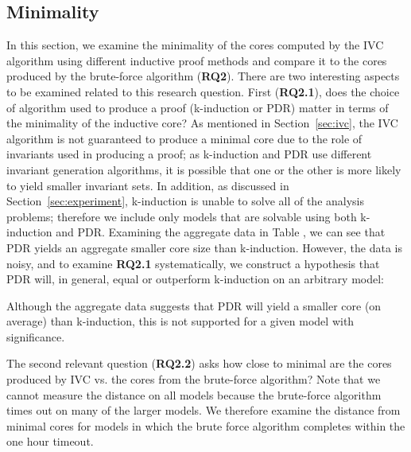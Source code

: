 \subsection{Minimality}
\label{sec:minimality}
In this section, we examine the minimality of the cores computed by the IVC algorithm using different inductive proof methods and compare it to the cores produced by the brute-force algorithm (\textbf{RQ2}).  There are two interesting aspects to be examined related to this research question.  First (\textbf{RQ2.1}), does the choice of algorithm used to produce a proof (k-induction or PDR) matter in terms of the minimality of the inductive core?   As mentioned in Section~\ref{sec:ivc}, the IVC algorithm is not guaranteed to produce a minimal core due to the role of invariants used in producing a proof; as k-induction and PDR use different invariant generation algorithms, it is possible that one or the other is more likely to yield smaller invariant sets.  In addition, as discussed in Section~\ref{sec:experiment}, k-induction is unable to solve all of the analysis problems; therefore we include only models that are solvable using both k-induction and PDR.  Examining the aggregate data in Table , we can see that PDR yields an aggregate smaller core size than k-induction.  However, the data is noisy, and to examine \textbf{RQ2.1} systematically, we construct a hypothesis that PDR will, in general, equal or outperform k-induction on an arbitrary model:


Although the aggregate data suggests that PDR will yield a smaller core (on average) than k-induction, this is not supported for a given model with significance.  


The second relevant question (\textbf{RQ2.2}) asks how close to minimal are the cores produced by IVC vs. the cores from the brute-force algorithm?  Note that we cannot measure the distance on all models because the brute-force algorithm times out on many of the larger models.  We therefore examine the distance from minimal cores for models in which the brute force algorithm completes within the one hour timeout.


